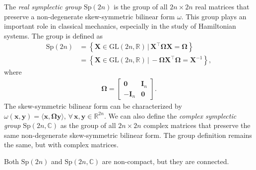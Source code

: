 \begin{example}\label{ex:symplectic-group}
    The \emph{real symplectic group} $\text{Sp}(2n)$ is the group of all $2n\times 2n$ real matrices that preserve a non-degenerate skew-symmetric bilinear form  $\omega$. This group plays an important role in classical mechanics, especially in the study of Hamiltonian systems. The group is defined as
    \begin{align}
        \text{Sp}(2n) &= \left\{\mathbf{X}\in\text{GL}(2n, \mathbb{R}) \,|\, \mathbf{X}^\top\boldsymbol{\Omega}\mathbf{X} = \boldsymbol{\Omega}\right\}\\
        &= \left\{\mathbf{X}\in\text{GL}(2n, \mathbb{R}) \,|\, -\boldsymbol{\Omega}\mathbf{X}^\top\boldsymbol{\Omega} = \mathbf{X}^{-1}\right\},
    \end{align}
    where 
    \begin{align}
        \boldsymbol{\Omega} = \begin{bmatrix}
            \mathbf{0} & \mathbf{I}_n\\
            -\mathbf{I}_n & \mathbf{0}
        \end{bmatrix}.
    \end{align}
    The skew-symmetric bilinear form can be characterized by $\omega(\mathbf{x},\mathbf{y})=\langle \mathbf{x}, \boldsymbol{\Omega}\mathbf{y}\rangle,\,\forall\,\mathbf{x},\mathbf{y}\in\mathbb{R}^{2n}$. We can also define the \emph{complex symplectic group} $\text{Sp}(2n, \mathbb{C})$ as the group of all $2n\times 2n$ complex matrices that preserve the same non-degenerate skew-symmetric bilinear form. The group definition remains the same, but with complex matrices.

    Both $\text{Sp}(2n)$ and $\text{Sp}(2n, \mathbb{C})$ are non-compact, but they are connected.
\end{example}
